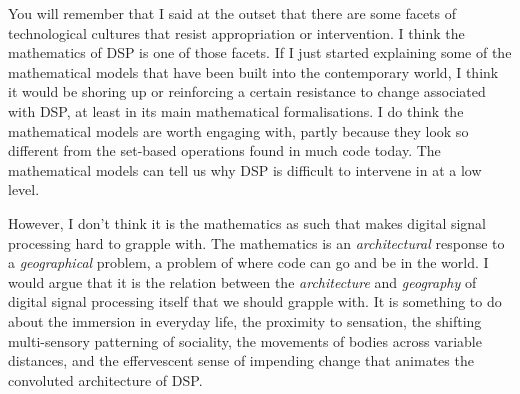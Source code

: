 You will remember that I said at the outset that there are some facets
of technological cultures that resist appropriation or intervention. I
think the mathematics of DSP is one of those facets. If I just started
explaining some of the mathematical models that have been built into
the contemporary world, I think it would be shoring up or reinforcing a
certain resistance to change associated with DSP, at least in its main
mathematical formalisations. I do think the mathematical models are
worth engaging with, partly because they look so different from the
set{}-based operations found in much code today. The mathematical
models can tell us why DSP is difficult to intervene in at a low level.

However, I don't think it is the mathematics as such that makes digital
signal processing hard to grapple with. The mathematics is an
{\em architectural} response to a {\em geographical} problem, a
problem of where code can go and be in the world. I would argue that it
is the relation between the {\em architecture} and {\em geography
}of digital signal processing itself that we should grapple with. It is
something to do about the immersion in everyday life, the proximity to
sensation, the shifting multi{}-sensory patterning of sociality, the
movements of bodies across variable distances, and the effervescent
sense of impending change that animates the convoluted architecture of
DSP.

